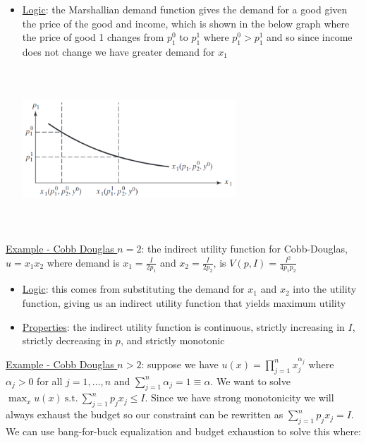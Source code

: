 \documentclass{article}
\begin{document}
  \begin{itemize}
    \item  \underline{Logic}: the Marshallian demand function gives the demand for a good given the price of the good and income, which is shown in the below graph where the price of good 1 changes from $p_{1}^{0}$ to $p_{1}^{1}$ where $p_{1}^{0} > p_{1}^{1}$ and so since income does not change we have greater demand for $x_{1}$
    \\
    \begin{center}
      \includegraphics[width=8cm, height=6cm]{pic25}
    \end{center}
  \end{itemize}
  \par
  \underline{Example - Cobb Douglas $n=2$}: the indirect utility function for Cobb-Douglas, $u = x_{1}x_{2}$ where demand is $x_{1} = \tfrac{I}{2p_{1}}$ and $x_{2} = \tfrac{I}{2p_{2}}$, is $V(p,I) = \tfrac{I^{2}}{4p_{1}p_{2}}$
  \begin{itemize}
    \item  \underline{Logic}: this comes from substituting the demand for $x_{1}$ and $x_{2}$ into the utility function, giving us an indirect utility function that yields maximum utility
    \item  \underline{Properties}: the indirect utility function is continuous, strictly increasing in $I$, strictly decreasing in $p$, and strictly monotonic
  \end{itemize}
  \underline{Example - Cobb Douglas $n>2$}: suppose we have $u(x) = \prod_{j=1}^{n} x_{j}^{\alpha_{j}}$ where $\alpha_{j} > 0$ for all $j = 1, \dots, n$ and $\sum_{j=1}^{n} \alpha_{j} = 1 \equiv \alpha$. We want to solve $\max_{x} u(x) \ \text{s.t.} \ \sum_{j=1}^{n}p_{j}x_{j} \leq I$. Since we have strong monotonicity we will always exhaust the budget so our constraint can be rewritten as $\sum_{j=1}^{n}p_{j}x_{j} = I$. We can use bang-for-buck equalization and budget exhaustion to solve this where:
\end{document}
